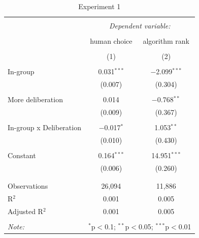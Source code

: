 \documentclass[12pt,letterpaper]{article}
\begin{document}
\begin{table}[!htbp] \centering 
  \caption{Experiment 1} 
  \label{} 
\begin{tabular}{@{\extracolsep{5pt}}lcc} 
\\[-1.8ex]\hline 
\hline \\[-1.8ex] 
 & \multicolumn{2}{c}{\textit{Dependent variable:}} \\ 
\cline{2-3} 
\\[-1.8ex] & human choice & algorithm rank \\ 
\\[-1.8ex] & (1) & (2)\\ 
\hline \\[-1.8ex] 
 In-group & 0.031$^{***}$ & $-$2.099$^{***}$ \\ 
  & (0.007) & (0.304) \\ 
  & & \\ 
 More deliberation & 0.014 & $-$0.768$^{**}$ \\ 
  & (0.009) & (0.367) \\ 
  & & \\ 
 In-group x Deliberation & $-$0.017$^{*}$ & 1.053$^{**}$ \\ 
  & (0.010) & (0.430) \\ 
  & & \\ 
 Constant & 0.164$^{***}$ & 14.951$^{***}$ \\ 
  & (0.006) & (0.260) \\ 
  & & \\ 
\hline \\[-1.8ex] 
Observations & 26,094 & 11,886 \\ 
R$^{2}$ & 0.001 & 0.005 \\ 
Adjusted R$^{2}$ & 0.001 & 0.005 \\ 
\hline 
\hline \\[-1.8ex] 
\textit{Note:}  & \multicolumn{2}{r}{$^{*}$p$<$0.1; $^{**}$p$<$0.05; $^{***}$p$<$0.01} \\ 
\end{tabular} 
\end{table} 
\end{document}

